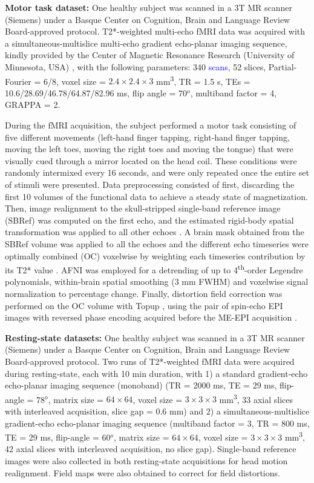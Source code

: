 \textbf{Motor task dataset:} One healthy subject was scanned in a 3T MR scanner
(Siemens) under a Basque Center on Cognition, Brain and Language Review
Board-approved protocol. T2*-weighted multi-echo fMRI data was acquired with a
simultaneous-multislice multi-echo gradient echo-planar imaging sequence, kindly
provided by the Center of Magnetic Resonance Research (University of Minnesota,
USA) \citep{Feinberg_2010,Moeller_2010,Setsompop_2011}, with the following
parameters: 340 \textcolor{blue}{scans}, 52 slices, Partial-Fourier =
6/8, voxel size = $2.4\times2.4\times3$ mm\textsuperscript{3}, TR = 1.5 s, TEs =
10.6/28.69/46.78/64.87/82.96 ms, flip angle = 70\(^o\), multiband factor = 4,
GRAPPA = 2.

During the fMRI acquisition, the subject performed a motor task consisting of
five different movements (left-hand finger tapping, right-hand finger tapping,
moving the left toes, moving the right toes and moving the tongue) that were
visually cued through a mirror located on the head coil. These conditions were
randomly intermixed every 16 seconds, and were only repeated once the entire set
of stimuli were presented. Data preprocessing consisted of first, discarding the
first 10 volumes of the functional data to achieve a steady state of
magnetization. Then, image realignment to the skull-stripped single-band
reference image (SBRef) was computed on the first echo, and the estimated
rigid-body spatial transformation was applied to all other echoes
\citep{Jenkinson2012FSL,Jenkinson_2001}. A brain mask obtained from the SBRef
volume was applied to all the echoes and the different echo timeseries were
optimally combined (OC) voxelwise by weighting each timeseries contribution by
its T2* value \citep{Posse_1999}. AFNI \citep{Cox1996AFNISoftwareAnalysis} was
employed for a detrending of up to 4\textsuperscript{th}-order Legendre
polynomials, within-brain spatial smoothing (3 mm FWHM) and voxelwise signal
normalization to percentage change. Finally, distortion field correction was
performed on the OC volume with Topup \citep{Andersson_2003}, using the pair of
spin-echo EPI images with reversed phase encoding acquired before the ME-EPI
acquisition \citep{Glasser_2016}.

\textbf{Resting-state datasets:} One healthy subject was scanned in a 3T MR
scanner (Siemens) under a Basque Center on Cognition, Brain and Language Review
Board-approved protocol. Two runs of T2*-weighted fMRI data were acquired during
resting-state, each with 10 min duration, with 1) a standard gradient-echo
echo-planar imaging sequence (monoband) (TR = 2000 ms, TE = 29 ms, flip-angle =
78\(^o\), matrix size = $64\times64$, voxel size = $3\times3\times3$
mm\textsuperscript{3}, 33 axial slices with interleaved acquisition, slice gap =
0.6 mm) and 2) a  simultaneous-multislice gradient-echo echo-planar imaging
sequence (multiband factor = 3, TR = 800 ms, TE = 29 ms, flip-angle = 60\(^o\),
matrix size = $64\times64$, voxel size = $3\times3\times3$
mm\textsuperscript{3}, 42 axial slices with interleaved acquisition, no slice
gap). Single-band reference images were also collected in both resting-state
acquisitions for head motion realignment. Field maps were also obtained to
correct for field distortions.

